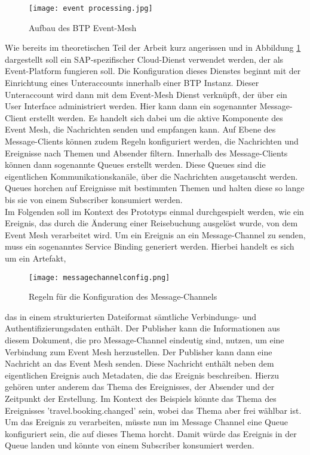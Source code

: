   \begin{figure}[H]
    \centering
    \texttt{[image: event processing.jpg]}
    \caption[BTP Event-Mesh]{Aufbau des BTP Event-Mesh \footnotemark}
    \label{EMprocessing}
  \end{figure}
  Wie bereits im theoretischen Teil der Arbeit kurz angerissen und in Abbildung \ref{EMprocessing} dargestellt soll ein SAP-spezifischer Cloud-Dienst verwendet werden, der als Event-Platform fungieren soll. Die Konfiguration dieses Dienstes beginnt mit der Einrichtung eines Unteraccounts innerhalb einer \ac{BTP} Instanz. Dieser Unteraccount wird dann mit dem Event-Mesh Dienst verknüpft, der über ein User Interface administriert werden. Hier kann dann ein sogenannter Message-Client erstellt werden. Es handelt sich dabei um die aktive Komponente des Event Mesh, die Nachrichten senden und empfangen kann. Auf Ebene des Message-Clients können zudem Regeln konfiguriert werden, die Nachrichten und Ereignisse nach Themen und Absender filtern. Innerhalb des Message-Clients können dann sogenannte Queues erstellt werden. Diese Queues sind die eigentlichen Kommunikationskanäle, über die Nachrichten ausgetauscht werden. Queues horchen auf Ereignisse mit bestimmten Themen und halten diese so lange bis sie von einem Subscriber konsumiert werden.\\ Im Folgenden soll im Kontext des Prototyps einmal durchgespielt werden, wie ein Ereignis, das durch die Änderung einer Reisebuchung ausgelöst wurde, von dem Event Mesh verarbeitet wird. Um ein Ereignis an ein Message-Channel zu senden, muss ein sogenanntes Service Binding generiert werden. Hierbei handelt es sich um ein Artefakt, 
   \begin{wrapfigure}{l}{7cm}
   \centering
   \texttt{[image: messagechannelconfig.png]}
   \caption[Message-Channel Konfiguration]{Regeln für die Konfiguration des Message-Channels \footnotemark}
   \label{MesChannelConfig}
 \end{wrapfigure}
  das in einem strukturierten Dateiformat sämtliche Verbindungs- und Authentifizierungsdaten enthält. Der Publisher kann die Informationen aus diesem Dokument, die pro Message-Channel eindeutig sind, nutzen, um eine Verbindung zum Event Mesh herzustellen. Der Publisher kann dann eine Nachricht an das Event Mesh senden. Diese Nachricht enthält neben dem eigentlichen Ereignis auch Metadaten, die das Ereignis beschreiben.  
  Hierzu gehören unter anderem das Thema des Ereignisses, der Absender und der Zeitpunkt der Erstellung. Im Kontext des Beispiels könnte das Thema des Ereignisses 'travel.booking.changed' sein, wobei das Thema aber frei wählbar ist. Um das Ereignis zu verarbeiten, müsste nun im Message Channel eine Queue konfiguriert sein, die auf dieses Thema horcht. Damit würde das Ereignis in der Queue landen und könnte von einem Subscriber konsumiert werden. 
